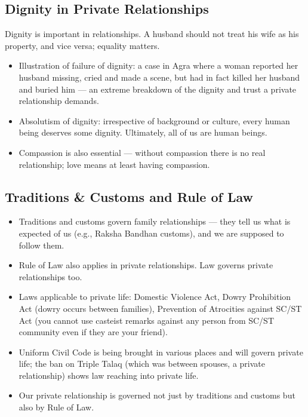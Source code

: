 \subsection{Dignity in Private Relationships}

Dignity is important in relationships. A husband should not treat his wife as his property, and vice versa; equality matters.

\begin{itemize}
\item Illustration of failure of dignity: a case in Agra where a woman reported her husband missing, cried and made a scene, but had in fact killed her husband and buried him --- an extreme breakdown of the dignity and trust a private relationship demands.
\item Absolutism of dignity: irrespective of background or culture, every human being deserves some dignity. Ultimately, all of us are human beings.
\item Compassion is also essential --- without compassion there is no real relationship; love means at least having compassion.
\end{itemize}

\subsection{Traditions \& Customs and Rule of Law}

\begin{itemize}
\item Traditions and customs govern family relationships --- they tell us what is expected of us (e.g., Raksha Bandhan customs), and we are supposed to follow them.
\item Rule of Law also applies in private relationships. Law governs private relationships too.
\end{itemize}

\begin{GovtPolicy}
\begin{itemize}
\item Laws applicable to private life: Domestic Violence Act, Dowry Prohibition Act (dowry occurs between families), Prevention of Atrocities against SC/ST Act (you cannot use casteist remarks against any person from SC/ST community even if they are your friend).
\item Uniform Civil Code is being brought in various places and will govern private life; the ban on Triple Talaq (which was between spouses, a private relationship) shows law reaching into private life.
\item Our private relationship is governed not just by traditions and customs but also by Rule of Law.
\end{itemize}
\end{GovtPolicy}

